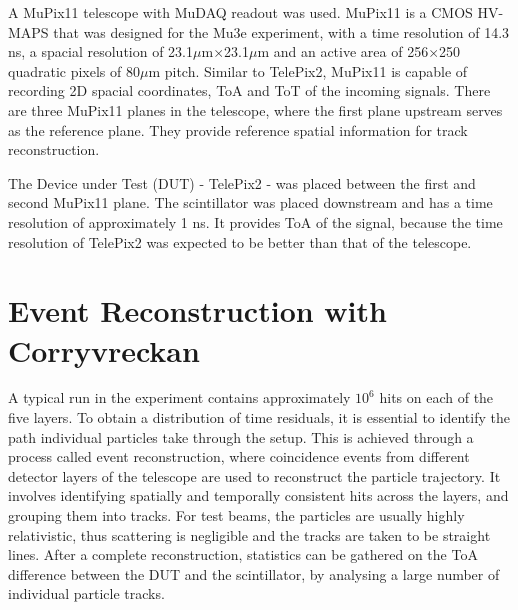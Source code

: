 A MuPix11 telescope with MuDAQ readout was used. MuPix11 is a CMOS HV-MAPS that was designed for the Mu3e experiment, with a time resolution of 14.3 ns\cite{Mupix}, a spacial resolution of 23.1$\mu$m$\times$23.1$\mu$m and an active area of 256$\times$250 quadratic pixels of 80$\mu$m pitch\cite{Mupix2}. Similar to TelePix2, MuPix11 is capable of recording 2D spacial coordinates, ToA and ToT of the incoming signals. There are three MuPix11 planes in the telescope, where the first plane upstream serves as the reference plane. They provide reference spatial information for track reconstruction.

The Device under Test (DUT) - TelePix2 - was placed between the first and second MuPix11 plane. The scintillator was placed downstream and has a time resolution of approximately 1 ns. It provides ToA of the signal, because the time resolution of TelePix2 was expected to be better than that of the telescope.


\section{Event Reconstruction with Corryvreckan}
\label{section4.2}

A typical run in the experiment contains approximately $10^6$ hits on each of the five layers. To obtain a distribution of time residuals, it is essential to identify the path individual particles take through the setup. This is achieved through a process called event reconstruction, where coincidence events from different detector layers of the telescope are used to reconstruct the particle trajectory. It involves identifying spatially and temporally consistent hits across the layers, and grouping them into tracks. For test beams, the particles are usually highly relativistic, thus scattering is negligible and the tracks are taken to be straight lines. After a complete reconstruction, statistics can be gathered on the ToA difference between the DUT and the scintillator, by analysing a large number of individual particle tracks. 






